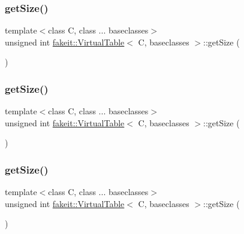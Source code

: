\subsubsection{\texorpdfstring{getSize()}{getSize()}\hspace{0.1cm}{\footnotesize\ttfamily [1/10]}}
{\footnotesize\ttfamily template$<$class C, class ... baseclasses$>$ \\
unsigned int \mbox{\hyperlink{structfakeit_1_1VirtualTable}{fakeit\+::\+Virtual\+Table}}$<$ C, baseclasses $>$\+::get\+Size (\begin{DoxyParamCaption}{ }\end{DoxyParamCaption})\hspace{0.3cm}{\ttfamily [inline]}}

\mbox{\label{structfakeit_1_1VirtualTable_a014d48c976f89207564bf8d68b64a039}} 
\subsubsection{\texorpdfstring{getSize()}{getSize()}\hspace{0.1cm}{\footnotesize\ttfamily [2/10]}}
{\footnotesize\ttfamily template$<$class C, class ... baseclasses$>$ \\
unsigned int \mbox{\hyperlink{structfakeit_1_1VirtualTable}{fakeit\+::\+Virtual\+Table}}$<$ C, baseclasses $>$\+::get\+Size (\begin{DoxyParamCaption}{ }\end{DoxyParamCaption})\hspace{0.3cm}{\ttfamily [inline]}}

\mbox{\label{structfakeit_1_1VirtualTable_a014d48c976f89207564bf8d68b64a039}} 
\subsubsection{\texorpdfstring{getSize()}{getSize()}\hspace{0.1cm}{\footnotesize\ttfamily [3/10]}}
{\footnotesize\ttfamily template$<$class C, class ... baseclasses$>$ \\
unsigned int \mbox{\hyperlink{structfakeit_1_1VirtualTable}{fakeit\+::\+Virtual\+Table}}$<$ C, baseclasses $>$\+::get\+Size (\begin{DoxyParamCaption}{ }\end{DoxyParamCaption})\hspace{0.3cm}{\ttfamily [inline]}}

